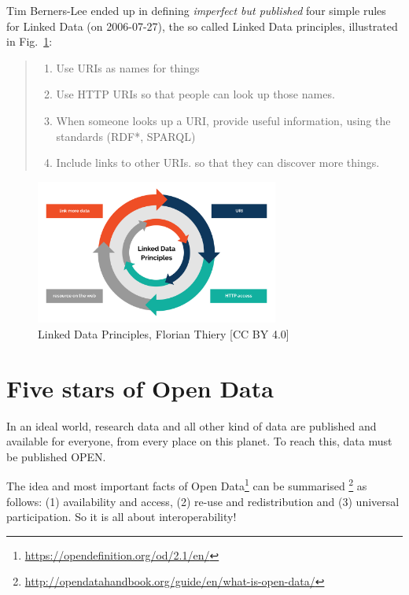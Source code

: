 \documentclass[twocolumn]{autart}
\begin{document}
Tim Berners-Lee ended up in defining \frqq\textit{imperfect but published}\flqq\cite{berners-lee_linked_2006} four simple rules for Linked Data (on 2006-07-27), the so called Linked Data principles\cite{berners-lee_linked_2006}, illustrated in Fig.~\ref{ld}:

\begin{quotation}
\begin{enumerate}
	\item Use URIs as names for things
	\item Use HTTP URIs so that people can look up those names.
	\item When someone looks up a URI, provide useful information, using the standards (RDF*, SPARQL)
	\item Include links to other URIs. so that they can discover more things.
\end{enumerate}
\end{quotation}

\begin{figure}[!htb]
\begin{center}
\includegraphics[width=8cm]{Linked_Data_Principles.png}
\caption{Linked Data Principles, Florian Thiery [CC BY 4.0]}
\label{ld}
\end{center}
\end{figure}

\section{Five stars of Open Data}

In an ideal world, research data and all other kind of data are published and available for everyone, from every place on this planet. To reach this, data must be published OPEN.

The idea and most important facts of Open Data\footnote{\url{https://opendefinition.org/od/2.1/en/}} can be summarised \footnote{\url{http://opendatahandbook.org/guide/en/what-is-open-data/}} as follows: (1) availability and access, (2) re-use and redistribution and (3) universal participation. So it is all about interoperability!
\end{document}
